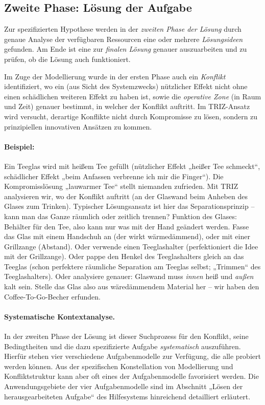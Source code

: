 \documentclass[11pt,a4paper]{article}
\begin{document}
\subsection{Zweite Phase: Lösung der Aufgabe}

Zur spezifizierten Hypothese werden in der \emph{zweiten Phase der Lösung}
durch genaue Analyse der verfügbaren Ressourcen eine oder mehrere
\emph{Lösungsideen} gefunden. Am Ende ist eine zur \emph{finalen Lösung}
genauer auszuarbeiten und zu prüfen, ob die Lösung auch funktioniert.

Im Zuge der Modellierung wurde in der ersten Phase auch ein \emph{Konflikt}
identifiziert, wo ein (aus Sicht des Systemzwecks) nützlicher Effekt nicht
ohne einen schädlichen weiteren Effekt zu haben ist, sowie die \emph{operative
  Zone} (in Raum und Zeit) genauer bestimmt, in welcher der Konflikt auftritt.
Im TRIZ-Ansatz wird versucht, derartige Konflikte nicht durch Kompromisse zu
lösen, sondern zu prinzipiellen innovativen Ansätzen zu kommen.

\paragraph{Beispiel:}
Ein Teeglas wird mit heißem Tee gefüllt (nützlicher Effekt „heißer Tee
schmeckt“, schädlicher Effekt „beim Anfassen verbrenne ich mir die Finger“).
Die Kompromisslösung „lauwarmer Tee“ stellt niemanden zufrieden.  Mit TRIZ
analysieren wir, wo der Konflikt auftritt (an der Glaswand beim Anheben des
Glases zum Trinken). Typischer Lösungsansatz ist hier das Separationsprinzip
-- kann man das Ganze räumlich oder zeitlich trennen?  Funktion des Glases:
Behälter für den Tee, also kann nur was mit der Hand geändert werden. Fasse
das Glas mit einem Handschuh an (der wirkt wärmedämmend), oder mit einer
Grillzange (Abstand). Oder verwende einen Teeglashalter (perfektioniert die
Idee mit der Grillzange).  Oder pappe den Henkel des Teeglashalters gleich an
das Teeglas (schon perfektere räumliche Separation am Teeglas selbst;
„Trimmen“ des Teeglashalters).  Oder analysiere genauer: Glaswand muss
\emph{innen} heiß und \emph{außen} kalt sein.  Stelle das Glas also aus
wäredämmendem Material her -- wir haben den Coffee-To-Go-Becher erfunden.

\paragraph{Systematische Kontextanalyse.}
In der zweiten Phase der Lösung ist dieser Suchprozess für den Konflikt, seine
Bedingtheiten und die dazu spezifizierte Aufgabe \emph{systematisch}
auszuführen.  Hierfür stehen vier verschiedene Aufgabenmodelle zur Verfügung,
die alle probiert werden können. Aus der spezifischen Konstellation von
Modellierung und Konfliktstruktur kann aber oft eines der Aufgabenmodelle
favorisiert werden.  Die Anwendungsgebiete der vier Aufgabenmodelle sind im
Abschnitt „Lösen der herausgearbeiteten Aufgabe“ des Hilfesystems hinreichend
detailliert erläutert.
\end{document}
